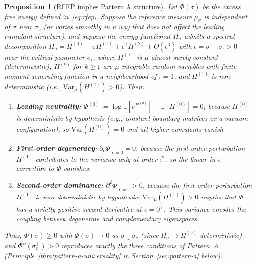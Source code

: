 \documentclass[12pt,a4paper]{article}
\newtheorem{proposition}[theorem]{Proposition}
\theoremstyle{definition}
\theoremstyle{remark}
\newcommand{\EE}{\mathbb{E}}
\begin{document}
\begin{proposition}[RFEP implies Pattern A structure]
\label{prop:rfep-to-pattern-a}
Let $\Phi(\sigma)$ be the excess free energy defined in~\eqref{eq:rfep}. Suppose the reference measure $\mu_\sigma$ is independent of $\sigma$ near $\sigma_c$ \textup{(}or varies smoothly in a way that does not affect the leading cumulant structure\textup{)}, and suppose the energy functional $H_\sigma$ admits a spectral decomposition $H_\sigma = H^{(0)} + \epsilon\, H^{(1)} + \epsilon^2\, H^{(2)} + O(\epsilon^{3})$ with $\epsilon = \sigma - \sigma_c > 0$ near the critical parameter $\sigma_c$, where $H^{(0)}$ is $\mu$-almost surely constant \textup{(}deterministic\textup{)}, $H^{(k)}$ for $k \ge 1$ are $\mu$-integrable random variables with finite moment generating function in a neighbourhood of $t = 1$, and $H^{(1)}$ is non-deterministic \textup{(}i.e., $\mathrm{Var}_\mu(H^{(1)}) > 0$\textup{)}. Then:
\begin{enumerate}[label=\textup{(\roman*)}]
    \item \textbf{Leading neutrality:} $\Phi^{(0)} := \log \EE[e^{H^{(0)}}] - \EE[H^{(0)}] = 0$, because $H^{(0)}$ is deterministic by hypothesis (e.g., constant boundary matrices or a vacuum configuration), so $\mathrm{Var}(H^{(0)}) = 0$ and all higher cumulants vanish.
    \item \textbf{First-order degeneracy:} $\partial_\epsilon \Phi|_{\epsilon=0} = 0$, because the first-order perturbation $H^{(1)}$ contributes to the variance only at order $\epsilon^2$, so the linear-in-$\epsilon$ correction to $\Phi$ vanishes.
    \item \textbf{Second-order dominance:} $\partial^2_\epsilon \Phi|_{\epsilon=0} > 0$, because the first-order perturbation $H^{(1)}$ is non-deterministic by hypothesis: $\mathrm{Var}_{\mu}(H^{(1)}) > 0$ implies that $\Phi$ has a strictly positive second derivative at $\epsilon = 0^+$. This variance encodes the coupling between degenerate and complementary eigenspaces.
\end{enumerate}
Thus, $\Phi(\sigma) \ge 0$ with $\Phi(\sigma) \to 0$ as $\sigma \downarrow \sigma_c$ (since $H_\sigma \to H^{(0)}$ deterministic) and $\Phi''(\sigma_c^+) > 0$ reproduces exactly the three conditions of Pattern~A (Principle~\ref{thm:pattern-a-universality} in Section~\ref{sec:pattern-a} below).
\end{proposition}
\end{document}
